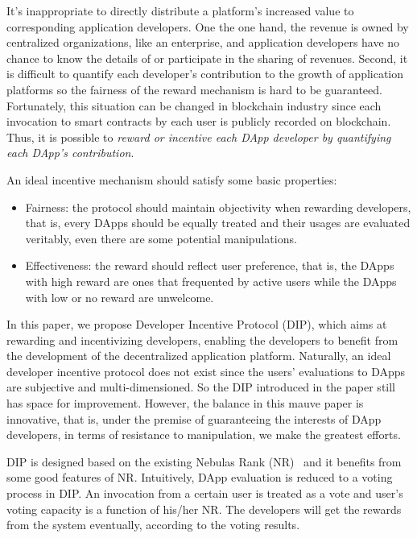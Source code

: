 It's inappropriate to directly distribute a platform's increased value to
corresponding application developers. One the one hand, the revenue is owned by
centralized organizations, like an enterprise, and application developers have
no chance to know the details of or participate in the sharing of revenues. Second, it
is difficult to quantify each developer's contribution to the growth of
application platforms so the fairness of the reward mechanism is hard to be guaranteed. Fortunately, this situation can be changed in blockchain
industry since each invocation to smart contracts by each user is
publicly recorded on
blockchain. Thus, it is possible to \emph{reward or incentive each DApp developer by
quantifying each DApp's contribution}.

An ideal incentive mechanism should satisfy some basic properties:
\begin{itemize}

\item Fairness: the protocol should maintain objectivity when rewarding developers, that is, every DApps should be equally treated and their usages are evaluated veritably, even there are some potential manipulations.

\item Effectiveness: the reward should reflect user preference, that is, the DApps with high reward are ones that frequented by active users while the DApps with low or no reward are unwelcome.
\end{itemize}

In this paper, we propose Developer Incentive Protocol (DIP), which aims at rewarding and incentivizing  developers, enabling the developers to benefit from the development of the decentralized application platform. Naturally, an ideal developer incentive protocol does not exist since the users' evaluations to DApps are subjective and multi-dimensioned. So the DIP introduced in the paper still has space for improvement. However, the balance in this mauve paper is innovative, that is, under the premise of guaranteeing the interests of DApp developers, in terms of resistance to manipulation, we make the greatest efforts.

DIP is designed based on the existing Nebulas Rank
(NR)~\cite{Nebulasyellowpaper} and it benefits from some good features of NR\@.
Intuitively, DApp evaluation is reduced to a voting process in DIP\@.
An invocation from a certain user is treated as a vote and user's voting
capacity is a function of his/her NR\@. The developers will get the rewards from the system eventually, according to the voting results.

